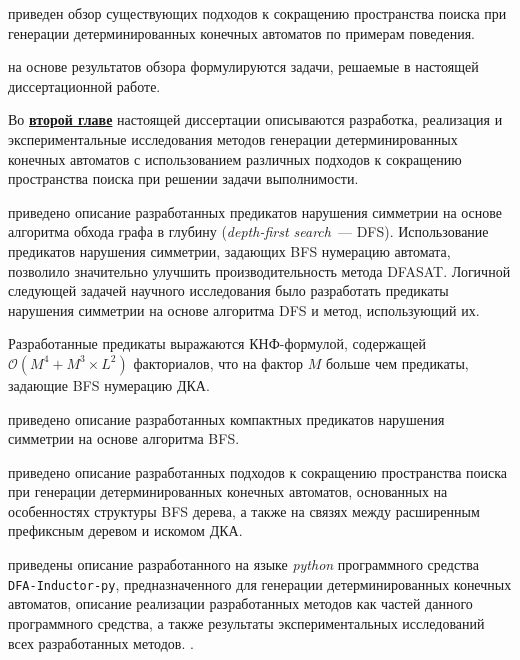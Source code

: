 
\insection{\ref{sec:review:sym-breaking}} приведен обзор существующих подходов к сокращению пространства поиска при генерации детерминированных конечных автоматов по примерам поведения.



\insection{\ref{sec:review:tasks}} на основе результатов обзора формулируются задачи, решаемые в настоящей диссертационной работе.


Во \textbf{\underline{второй главе}} настоящей диссертации описываются разработка, реализация и экспериментальные исследования методов генерации детерминированных конечных автоматов с использованием различных подходов к сокращению пространства поиска при решении задачи выполнимости.

\insection{\ref{sec:space:dfs}} приведено описание разработанных предикатов нарушения симметрии на основе алгоритма обхода графа в глубину (\emph{depth-first search}~--- DFS). 
Использование предикатов нарушения симметрии, задающих BFS нумерацию автомата, позволило значительно улучшить производительность метода DFASAT.
Логичной следующей задачей научного исследования было разработать предикаты нарушения симметрии на основе алгоритма DFS и метод, использующий их.

Разработанные предикаты выражаются КНФ-формулой, содержащей $\mathcal{O}\left(M^{4} + M^{3} \times L^{2}\right)$ факториалов, что на фактор $M$ больше чем предикаты, задающие BFS нумерацию ДКА.

\insection{\ref{sec:space:tight}} приведено описание разработанных компактных предикатов нарушения симметрии на основе алгоритма BFS.  

\insection{\ref{sec:space:pruning}} приведено описание разработанных подходов к сокращению пространства поиска при генерации детерминированных конечных автоматов, основанных на особенностях структуры BFS дерева, а также на связях между расширенным префиксным деревом и искомом ДКА. 

\insection{\ref{sec:space:results}} приведены описание разработанного  на языке \emph{python} программного средства \texttt{DFA-Inductor-py}, предназначенного для генерации детерминированных конечных автоматов, описание реализации разработанных методов как частей данного программного средства, а также результаты экспериментальных исследований всех разработанных методов.  .

